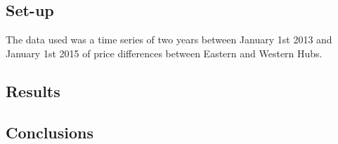 \documentclass{report}
\begin{document}
\subsection*{Set-up}
The data used was a time series of two years between January 1st 2013 and
January 1st 2015 of price differences between Eastern and Western Hubs.
\subsection*{Results}
\subsection*{Conclusions}

\nocite{*}


\end{document}
